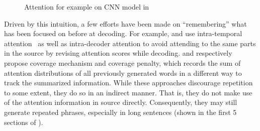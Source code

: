 \begin{figure}[th!]
\centering
{}
\quad
{}
\quad
{}
\caption{Attention for example on CNN model in }
\label{fig:attn_map}
\end{figure}

Driven by this intuition, a few efforts have been made on ``remembering''
what has been focused on before at decoding. 
For example, 
\cite{PaulusXS17} and 
\cite{FanGA18} use intra-temporal 
attention~\citep{NallapatiZSGX16} as well as intra-decoder attention to avoid
attending to the same parts in the source by 
revising attention scores while decoding. 
\cite{SeeLM17} and \cite{GehrmannDR18}
respectively propose coverage mechanism and coverage penalty,
which records the sum of attention distributions of all previously generated words 
in a different way to track the summarized information.  
While these approaches discourage repetition to some extent,
they do so in an indirect manner. That is, they do not 
make use of the attention information in source directly.
Consequently, they may still generate repeated phrases, 
especially in long sentences (shown in the first 5 sections of
).


